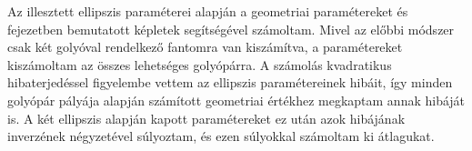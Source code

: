 \documentclass[a4paper,12pt]{article}
\begin{document}
Az illesztett ellipszis paraméterei alapján a geometriai paramétereket   és  fejezetben bemutatott képletek segítségével számoltam. Mivel az előbbi módszer csak két golyóval rendelkező fantomra van kiszámítva, a paramétereket kiszámoltam az összes lehetséges golyópárra. A számolás kvadratikus hibaterjedéssel figyelembe vettem az ellipszis paramétereinek hibáit, így minden golyópár pályája alapján számított geometriai értékhez megkaptam annak hibáját is. A két ellipszis alapján kapott paramétereket ez után azok hibájának inverzének négyzetével súlyoztam, és ezen súlyokkal számoltam ki átlagukat. 



%
%
%




\clearpage



 
\end{document}
